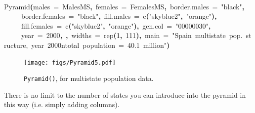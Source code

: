 \documentclass[a4paper]{article}
\newcommand{\hlnumber}[1]{\textcolor[rgb]{0.0823529411764706,0.0784313725490196,0.709803921568627}{#1}}%
\newcommand{\hlfunctioncall}[1]{\textcolor[rgb]{1,0,0}{#1}}%
\newcommand{\hlstring}[1]{\textcolor[rgb]{0.6,0.6,1}{#1}}%
\newcommand{\hlkeyword}[1]{\textcolor[rgb]{0,0,0}{\textbf{#1}}}%
\newcommand{\hlargument}[1]{\textcolor[rgb]{0.694117647058824,0.247058823529412,0.0196078431372549}{#1}}%
\newcommand{\hlsymbol}[1]{\textcolor[rgb]{0,0,0}{#1}}%
\newcommand{\hlprompt}[1]{\textcolor[rgb]{0,0,0}{#1}}%
\newcommand{\hlstd}[1]{\textcolor[rgb]{0,0,0}{#1}}%
\newenvironment{Houtput}{\raggedright}{%
%
}
\begin{document}
\begin{Houtput}
\hspace*{\fill}\\
\hlstd{}\ttfamily\noindent
\hlprompt{\usebox{\hlnormalsizeboxgreaterthan}{\ }}\hlfunctioncall{Pyramid}\hlkeyword{(}\hlargument{males}{\ }\hlargument{=}{\ }\hlsymbol{MalesMS}\hlkeyword{,}{\ }\hlargument{females}{\ }\hlargument{=}{\ }\hlsymbol{FemalesMS}\hlkeyword{,}{\ }\hlargument{border.males}{\ }\hlargument{=}{\ }\hlstring{"black"}\hlkeyword{,}\hspace*{\fill}\\
\hlstd{}\hlprompt{{\ }}{\ }{\ }{\ }{\ }\hlargument{border.females}{\ }\hlargument{=}{\ }\hlstring{"black"}\hlkeyword{,}{\ }\hlargument{fill.males}{\ }\hlargument{=}{\ }\hlfunctioncall{c}\hlkeyword{(}\hlstring{"skyblue2"}\hlkeyword{,}{\ }\hlstring{"orange"}\hlkeyword{)}\hlkeyword{,}\hspace*{\fill}\\
\hlstd{}\hlprompt{{\ }}{\ }{\ }{\ }{\ }\hlargument{fill.females}{\ }\hlargument{=}{\ }\hlfunctioncall{c}\hlkeyword{(}\hlstring{"skyblue2"}\hlkeyword{,}{\ }\hlstring{"orange"}\hlkeyword{)}\hlkeyword{,}{\ }\hlargument{gen.col}{\ }\hlargument{=}{\ }\hlstring{"\usebox{\hlnormalsizeboxhash}00000030"}\hlkeyword{,}\hspace*{\fill}\\
\hlstd{}\hlprompt{{\ }}{\ }{\ }{\ }{\ }\hlargument{year}{\ }\hlargument{=}{\ }\hlnumber{2000}\hlkeyword{,}{\ }\hlkeyword{,}{\ }\hlargument{widths}{\ }\hlargument{=}{\ }\hlfunctioncall{rep}\hlkeyword{(}\hlnumber{1}\hlkeyword{,}{\ }\hlnumber{111}\hlkeyword{)}\hlkeyword{,}{\ }\hlargument{main}{\ }\hlargument{=}{\ }\hlstring{"Spain{\ }multistate{\ }pop.{\ }structure,{\ }year{\ }2000\usebox{\hlnormalsizeboxbackslash}ntotal{\ }population{\ }={\ }40.1{\ }million"}\hlkeyword{)}\mbox{}
\normalfont
\hspace*{\fill}\\
\hlstd{}
\end{Houtput}



\begin{figure}[H]
\centering
\texttt{[image: figs/Pyramid5.pdf]}
\caption{\texttt{Pyramid()}, for multistate population data.}
\end{figure}

There is no limit to the number of states you can introduce into the pyramid in this way (i.e. simply adding columns).

\nocite{*} %

\end{document}
